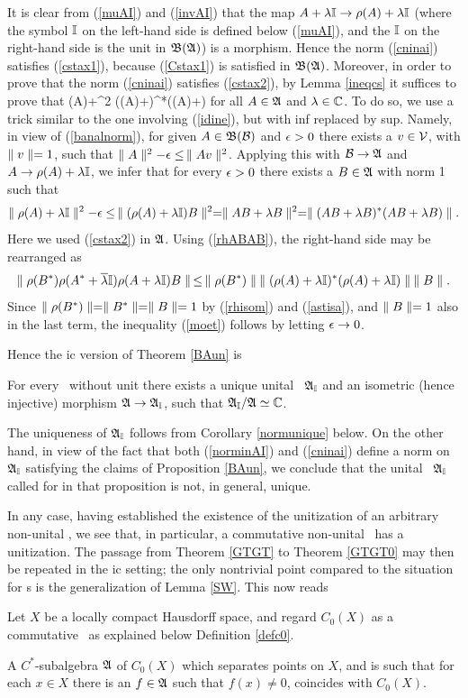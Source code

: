 It is clear from (\ref{muAI}) and (\ref{invAI}) that the map
$A+\lambda{\Bbb I}\rightarrow\rho(A)+\lambda{\Bbb I}$ (where the symbol ${\Bbb I}$ on the left-hand side
is defined below (\ref{muAI}), and the ${\Bbb I}$ on the right-hand side is
the unit in ${\frak B}({\frak A})$) is a morphism.  Hence the norm (\ref{cninai})
satisfies (\ref{cstax1}), because (\ref{Cstax1}) is satisfied in
${\frak B}({\frak A})$.  Moreover, in order to prove that the norm (\ref{cninai})
satisfies (\ref{cstax2}), by Lemma \ref{ineqcs} it suffices to prove
that \be \n\rh(A)+\lm\I\n^2\,\leq\,\n (\rh(A)+\lm\I)^*(\rh(A)+\lm\I)\n
{} \ee for all $A\in{\frak A}$ and $\lambda\in{\Bbb C}$. To do so, we use a
trick similar to the one involving (\ref{idine}), but with inf
replaced by sup.  Namely, in view of (\ref{banalnorm}), for given
$A\in{\frak B}({\cal B})$ and $\epsilon>0$ there exists a $v\in{\cal V}$, with $\parallel v\parallel=1$,
such that $\parallel A\parallel^2-\epsilon \leq\,\parallel Av\parallel^2$. Applying this with
${\cal B}\rightarrow{\frak A}$ and $A\rightarrow \rho(A)+\lambda{\Bbb I}$, we infer that for every $\epsilon>0$
there exists a $B\in{\frak A}$ with norm 1 such that
$$
\parallel\rho(A)+\lambda{\Bbb I}\parallel^2-\epsilon \leq\,\parallel (\rho(A)+\lambda{\Bbb I})B\parallel^2= \parallel AB+\lambda
B\parallel^2=\parallel (AB+\lambda B)^*(AB+\lambda B)\parallel.
$$
Here we used (\ref{cstax2}) in ${\frak A}$. Using (\ref{rhABAB}), the
right-hand side may be rearranged as
$$
\parallel \rho(B^*) \rho(A^*+\overline{\lambda}{\Bbb I})\rho(A+\lambda{\Bbb I})B\parallel\,\leq\,\parallel
\rho(B^*)\parallel\:\parallel (\rho(A)+\lambda{\Bbb I})^*(\rho(A)+\lambda{\Bbb I})\parallel\:\parallel B\parallel.
$$
Since $\parallel\rho(B^*)\parallel=\parallel B^*\parallel=\parallel B\parallel=1$ by (\ref{rhisom}) and
(\ref{astisa}), and $\parallel B\parallel=1$ also in the last term, the inequality
(\ref{moet}) follows by letting $\epsilon\rightarrow 0$. \enp

Hence the \ca ic version of Theorem \ref{BAun} is
\begin{Proposition}
For every \ca\ without unit there exists a unique unital \ca\ ${\frak A}_{\Bbb I}$
and an isometric (hence injective) morphism ${\frak A}\rightarrow{\frak A}_{\Bbb I}$, such that
${\frak A}_{\Bbb I}/{\frak A}\simeq{\Bbb C}$. \end{Proposition}

The uniqueness of ${\frak A}_{\Bbb I}$ follows from Corollary \ref{normunique} below.
On the other hand, in view of the fact that both (\ref{norminAI}) and
(\ref{cninai}) define a norm on ${\frak A}_{\Bbb I}$ satisfying the claims of
Proposition \ref{BAun}, we conclude that the unital \BA\ ${\frak A}_{\Bbb I}$ called
for in that proposition is not, in general, unique.

In any case, having established the existence of the unitization of an
arbitrary non-unital \ca, we see that, in particular, a commutative
non-unital \ca\ has a unitization. The passage from Theorem \ref{GTGT}
to Theorem \ref{GTGT0} may then be repeated in the \ca ic setting; the
only nontrivial point compared to the situation for \BA s is the
generalization of Lemma \ref{SW}. This now reads
\begin{Lemma} 
Let $X$ be a locally compact Hausdorff space, and regard $C_0(X)$ as a
commutative \ca\ as explained below Definition \ref{defc0}.

A $C^*$-subalgebra ${\frak A}$ of $C_0(X)$ which separates points on $X$, and
is such that for each $x\in X$ there is an $f\in{\frak A}$ such that
$f(x)\neq 0$, coincides with $C_0(X)$. \end{Lemma}
 
